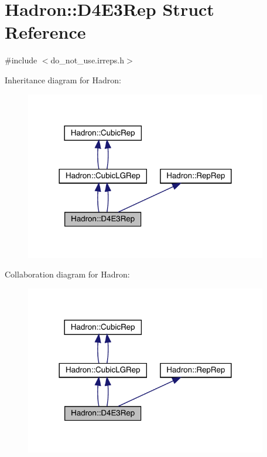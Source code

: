 \hypertarget{structHadron_1_1D4E3Rep}{}\section{Hadron\+:\+:D4\+E3\+Rep Struct Reference}
\label{structHadron_1_1D4E3Rep}


{\ttfamily \#include $<$do\+\_\+not\+\_\+use.\+irreps.\+h$>$}



Inheritance diagram for Hadron\+:\nopagebreak
\begin{figure}[H]
\begin{center}
\leavevmode
\includegraphics[width=300pt]{d0/d73/structHadron_1_1D4E3Rep__inherit__graph}
\end{center}
\end{figure}


Collaboration diagram for Hadron\+:\nopagebreak
\begin{figure}[H]
\begin{center}
\leavevmode
\includegraphics[width=300pt]{d3/d80/structHadron_1_1D4E3Rep__coll__graph}
\end{center}
\end{figure}
